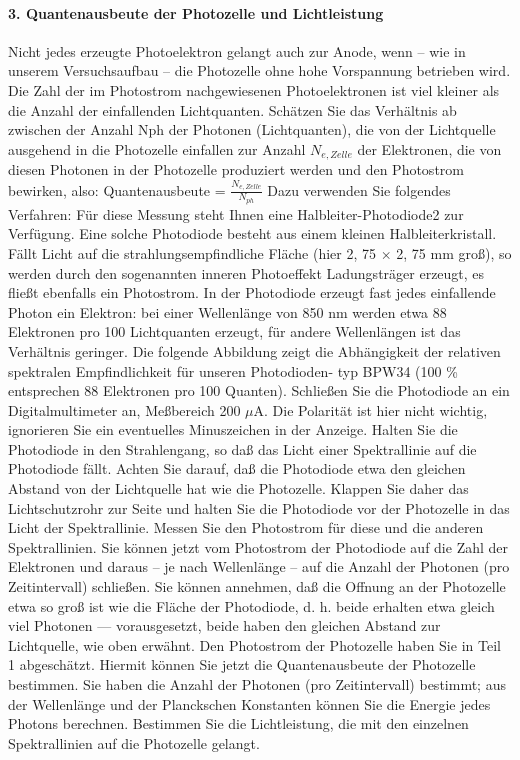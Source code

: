 \documentclass[12pt]{scrartcl}
\begin{document}
\paragraph{3. Quantenausbeute der Photozelle und Lichtleistung}
Nicht jedes erzeugte Photoelektron gelangt auch zur Anode, wenn -- wie in unserem Versuchsaufbau -- die
Photozelle ohne hohe Vorspannung betrieben wird. Die Zahl der im Photostrom nachgewiesenen Photoelektronen
ist viel kleiner als die Anzahl der einfallenden Lichtquanten. %
Schätzen Sie das Verhältnis ab zwischen
der Anzahl Nph der Photonen (Lichtquanten), die von der Lichtquelle ausgehend in die Photozelle einfallen zur
Anzahl $N_{e,Zelle}$ der Elektronen, die von diesen Photonen in der Photozelle produziert werden und den Photostrom
bewirken, also:
Quantenausbeute =
$\frac{N_{e,Zelle}}
{N_{ph}}$
Dazu verwenden Sie folgendes Verfahren:
Für diese Messung steht Ihnen eine Halbleiter-Photodiode2 zur Verfügung. Eine solche Photodiode besteht aus einem kleinen Halbleiterkristall. Fällt Licht auf die strahlungsempfindliche Fläche (hier 2, 75 $\times$ 2, 75 mm groß),
so werden durch den sogenannten inneren Photoeffekt Ladungsträger erzeugt, es fließt ebenfalls ein Photostrom.
In der Photodiode erzeugt fast jedes einfallende Photon ein Elektron: bei einer Wellenlänge von 850 nm werden
etwa 88 Elektronen pro 100 Lichtquanten erzeugt, für andere Wellenlängen ist das Verhältnis geringer.
Die folgende Abbildung zeigt die Abhängigkeit der relativen spektralen Empfindlichkeit für unseren Photodioden-
typ BPW34 (100 \% entsprechen 88 Elektronen pro 100 Quanten).
Schließen Sie die Photodiode an ein Digitalmultimeter an, Meßbereich 200 $\mu$A. Die Polarität ist hier nicht wichtig,
ignorieren Sie ein eventuelles Minuszeichen in der Anzeige. Halten Sie die Photodiode in den Strahlengang, so
daß das Licht einer Spektrallinie auf die Photodiode fällt. Achten Sie darauf, daß die Photodiode etwa den gleichen
Abstand von der Lichtquelle hat wie die Photozelle.
Klappen Sie daher das Lichtschutzrohr zur Seite
und halten Sie die Photodiode vor der Photozelle in das Licht der Spektrallinie.
Messen Sie den Photostrom für diese und die anderen Spektrallinien.
Sie können jetzt vom Photostrom der Photodiode auf die Zahl der Elektronen und daraus -- je nach Wellenlänge
-- auf die Anzahl der Photonen (pro Zeitintervall) schließen.
Sie können annehmen, daß die Offnung an der Photozelle etwa so groß ist wie die Fläche der Photodiode, d. h.
beide erhalten etwa gleich viel Photonen — vorausgesetzt, beide haben den gleichen Abstand zur Lichtquelle, wie
oben erwähnt. Den Photostrom der Photozelle haben Sie in Teil 1 abgeschätzt. Hiermit können Sie jetzt die
Quantenausbeute der Photozelle bestimmen.
Sie haben die Anzahl der Photonen (pro Zeitintervall) bestimmt; aus der Wellenlänge und der Planckschen Konstanten können Sie die Energie jedes Photons berechnen. Bestimmen Sie die Lichtleistung, die mit den einzelnen
Spektrallinien auf die Photozelle gelangt.
\end{document}

